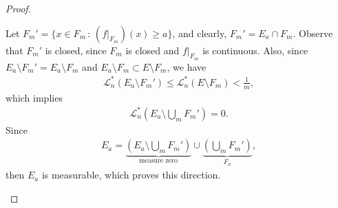 \documentclass[11pt]{book}
\theoremstyle{definition}
\numberwithin{equation}{chapter}
\begin{document}
\begin{proof}
\begin{enumerate}
    Let $F_m' = \{x \in F_m \,:\, \left(f|_{F_m}\right)(x) \geq a \}$, and clearly, $F_m' = E_a \cap F_m$. Observe that $F_m'$ is closed, since $F_m$ is closed and $f|_{F_m}$ is continuous. Also, since $E_a \setminus F_m' = E_a \setminus F_m$ and $E_a \setminus F_m \subset E \setminus F_m$, we have
    \begin{align*}
        \mathcal{L}_n^*(E_a \setminus F_m') \leq \mathcal{L}_n^*(E \setminus F_m) < \frac{1}{m},
    \end{align*}
    which implies
    \begin{align*}
        \mathcal{L}_n^*\left(E_a \setminus \bigcup_m F_m'\right) = 0.
    \end{align*}
    Since
    \begin{align*}
        E_a = \underbrace{\left(E_a \setminus \bigcup_m F_m'\right)}_{\text{measure zero}}  \cup \underbrace{\left(\bigcup_m F_m'\right)}_{F_\sigma},
    \end{align*}
    then $E_a$ is measurable, which proves this direction.
\end{enumerate}
\end{proof}

\medskip
\end{document}
